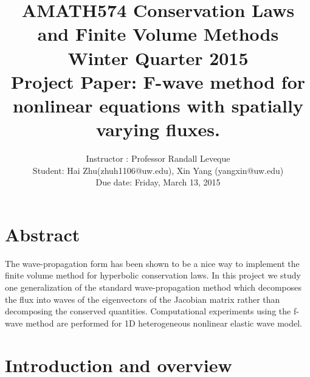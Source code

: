 \documentclass{article}
\begin{document}
\title{AMATH574 Conservation Laws and Finite Volume Methods\\ Winter Quarter 2015\\ Project Paper: F-wave method for nonlinear equations with spatially varying fluxes.}
\author{Instructor : Professor Randall Leveque\\ Student: Hai Zhu(zhuh1106@uw.edu), Xin Yang (yangxin@uw.edu)\\ Due date: Friday, March 13, 2015}
\maketitle

\section{Abstract}
The wave-propagation form has been shown to be a nice way to implement the finite volume method for hyperbolic conservation laws. In this project we study one generalization of the standard wave-propagation method which decomposes the flux into waves of the eigenvectors of the Jacobian matrix rather than decomposing the conserved quantities. Computational experiments using the f-wave method are performed for 1D heterogeneous nonlinear elastic wave model.
\section{Introduction and overview}
\end{document}
